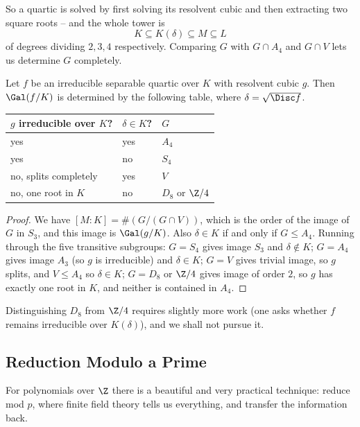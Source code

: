 So a quartic is solved by first solving its resolvent cubic and then extracting two square roots -- and the whole tower is
$$K \subseteq K(\delta) \subseteq M \subseteq L$$
of degrees dividing $2, 3, 4$ respectively. Comparing $G$ with $G \cap A_4$ and $G \cap V$ lets us determine $G$ completely.

\begin{proposition}
	Let $f$ be an irreducible separable quartic over $K$ with resolvent cubic $g$. Then $\Gal(f/K)$ is determined by the following table, where $\delta = \sqrt{\Disc f}$.
	\begin{center}
		\begin{tabular}{lll}
			\hline
			$g$ irreducible over $K$? & $\delta \in K$? & $G$ \\
			\hline
			yes & yes & $A_4$ \\
			yes & no & $S_4$ \\
			no, splits completely & yes & $V$ \\
			no, one root in $K$ & no & $D_8$ or $\Z/4$ \\
			\hline
		\end{tabular}
	\end{center}
\end{proposition}

\begin{proof}
	We have $[M:K] = \#(G/(G\cap V))$, which is the order of the image of $G$ in $S_3$, and this image is $\Gal(g/K)$. Also $\delta \in K$ if and only if $G \leq A_4$. Running through the five transitive subgroups: $G = S_4$ gives image $S_3$ and $\delta\notin K$; $G = A_4$ gives image $A_3$ (so $g$ is irreducible) and $\delta \in K$; $G = V$ gives trivial image, so $g$ splits, and $V \leq A_4$ so $\delta\in K$; $G = D_8$ or $\Z/4$ gives image of order $2$, so $g$ has exactly one root in $K$, and neither is contained in $A_4$.
\end{proof}

Distinguishing $D_8$ from $\Z/4$ requires slightly more work (one asks whether $f$ remains irreducible over $K(\delta)$), and we shall not pursue it.

\subsection{Reduction Modulo a Prime}

For polynomials over $\Z$ there is a beautiful and very practical technique: reduce mod $p$, where finite field theory tells us everything, and transfer the information back.

